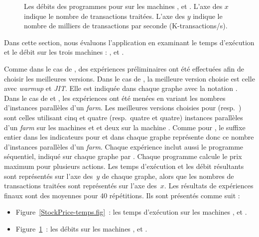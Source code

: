 \begin{figure}




\caption[Les débits pour  sur
les machines ,  et .]{Les débits des programmes
pour  sur les machines ,  et . L'axe des $x$
indique le nombre de transactions traitées. L'axe des $y$ indique le nombre de milliers de transactions par seconde (K-transactions/s).}
\label{StockPrice-debits.fig}
\end{figure}


Dans cette section, nous \'evaluons l'application  en examinant le temps d'ex\'ecution et le d\'ebit sur les trois machines : ,  et . 

Comme dans le cas de , des exp\'eriences pr\'eliminaires ont \'et\'e effectu\'ees afin de choisir les meilleures versions. Dans le cas de , la meilleure version choisie est celle avec \emph{warmup} et \emph{JIT}. Elle est indiqu\'ee dans chaque graphe avec la notation . Dans le cas de  et , les exp\'eriences ont \'et\'e men\'ees en variant les nombres d'instances parall\`eles d'un \emph{farm}. Les meilleures versions choisies pour  (resp.\ ) sont celles utilisant cinq et quatre (resp.\ quatre et quatre) instances parall\`eles d'un \emph{farm} sur les machines  et  et deux sur la machine . Comme pour , le suffixe entier dans les indicateurs pour  et  dans chaque graphe repr\'esente donc ce nombre d'instances parall\`eles d'un \emph{farm}. Chaque exp\'erience inclut aussi le programme s\'equentiel, indiqu\'e sur chaque graphe par . Chaque programme calcule le prix maximum pour plusieurs actions. Les temps d'ex\'ecution et les d\'ebit r\'esultants sont repr\'esent\'es sur l'axe des~$y$ de chaque graphe, alors que les nombres de transactions trait\'ees sont repr\'esent\'es sur l'axe des~$x$. Les r\'esultats de exp\'eriences finaux sont des moyennes pour 40 r\'ep\'etitions. Ils sont pr\'esent\'es comme suit :


\begin{itemize}

\item Figure~\ref{StockPrice-temps.fig}~: les temps d'ex\'ecution sur les machines ,  et .

\item Figure~\ref{StockPrice-debits.fig}~: les d\'ebits sur les machines ,  et .

\end{itemize}


